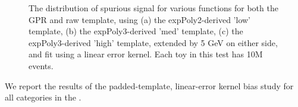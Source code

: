 \begin{figure} 
\begin{center}

\caption{The distribution of spurious signal for various functions for both the GPR and raw template, using (a) the expPoly2-derived 'low' template, (b) the expPoly3-derived 'med' template, (c) the expPoly3-derived 'high' template, extended by 5 GeV on either side, and fit using a linear error kernel. Each toy in this test has 10M events.}
\label{fig:linearkernel_lowpt_10M_noSig}
\end{center}
\end{figure}

We report the results of the padded-template, linear-error kernel bias study for all categories in the \Tab{\ref{tab:NoSigSSlinear}}. 

